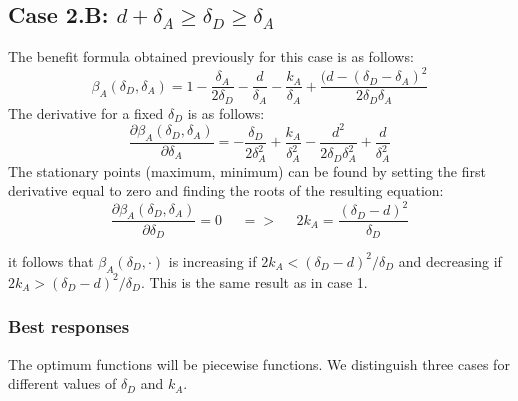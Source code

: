 \subsection*{Case 2.B: $d+\delta_{A} \geq \delta_{D} \geq  \delta_{A} $} 

The benefit formula obtained previously for this case is as follows: 
\begin{equation*}
\beta_{A}(\delta_{D},\delta_{A}) = 1 - \dfrac{\delta_{A}}{2\delta_{D}} - \dfrac{d}{\delta_{A}} - \dfrac{k_{A}}{\delta_{A}} + \dfrac{(d-(\delta_{D}-\delta_{A})^{2}}{2\delta_{D}\delta_{A}} 
\end{equation*}
The derivative for a fixed $\delta_{D}$ is as follows:
\begin{equation*}
\dfrac{\partial \beta_{A}(\delta_{D},\delta_{A})}{\partial \delta_{A}} = -\dfrac{\delta_{D}}{2\delta_{A}^{2}} + \dfrac{k_{A}}{\delta_{A}^{2}} - \dfrac{d^{2}}{2\delta_{D}\delta_{A}^{2}} + \dfrac{d}{\delta_{A}^{2}}
\end{equation*}
The stationary points (maximum, minimum) can be found by setting the first derivative equal to zero and finding the roots of the resulting equation:
\begin{equation*}
\frac{\partial \beta_{A}(\delta_{D},\delta_{A})}{\partial \delta_{D}} =0 ~~~~~~ =>~~~~~~ 2k_{A} = \dfrac{(\delta_{D}-d)^{2}}{\delta_{D}}
\end{equation*}

it follows that $\beta_{A}(\delta_{D},\cdot)$ is increasing if $2k_{A} < (\delta_{D} - d)^{2} / \delta_{D}$ and decreasing if $2k_{A} > (\delta_{D} - d)^{2} / \delta_{D}$. This is the same result as in case 1.\\


\subsubsection{Best responses}
The optimum functions will be piecewise functions. We distinguish three cases for different values of $\delta_{D}$ and $k_{A}$. 


